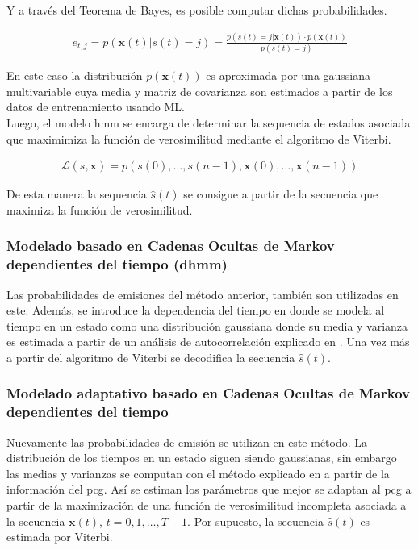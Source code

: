\indent Y a través del Teorema de Bayes, es posible computar dichas probabilidades.

\begin{align}
  e_{t,j} = p(\mathbf{x}(t)|s(t)=j) = \frac{p(s(t) = j|\mathbf{x}(t)) \cdot p(\mathbf{x}(t))}{p(s(t) = j)}
\end{align}

\indent En este caso la distribución $p(\mathbf{x}(t))$ es aproximada por una gaussiana multivariable cuya media y
matriz de covarianza son estimados a partir de los datos de entrenamiento usando ML. \\
\indent Luego, el modelo \acrshort{hmm} se encarga de determinar la sequencia de estados asociada que maximimiza la
función de verosimilitud mediante el algoritmo de Viterbi.

\begin{align}
  \mathcal{L}(s,\mathbf{x}) = p(s(0),\dots,s(n-1),\mathbf{x}(0),\dots,\mathbf{x}(n-1))
\end{align}

\indent De esta manera la sequencia $\hat{s}(t)$ se consigue a partir de la secuencia que maximiza la función de
verosimilitud.

\subsubsection*{Modelado basado en Cadenas Ocultas de Markov dependientes del tiempo (\acrshort{dhmm})}

\indent Las probabilidades de emisiones del método anterior, también son utilizadas en este. Además, se introduce la
dependencia del tiempo en donde se modela al tiempo en un estado como una distribución gaussiana donde su media y
varianza es estimada a partir de un análisis de autocorrelación explicado en \cite{pp:schmidt2010}. Una vez más a
partir del algoritmo de Viterbi se decodifica la secuencia $\hat{s}(t)$.

\subsubsection*{Modelado adaptativo basado en Cadenas Ocultas de Markov dependientes del tiempo}

\indent Nuevamente las probabilidades de emisión se utilizan en este método. La distribución de los tiempos en un
estado siguen siendo gaussianas, sin embargo las medias y varianzas se computan con el método explicado en
\cite{pp:oliveira-renna-coimbra} a partir de la información del \acrshort{pcg}. Así se estiman los parámetros que
mejor se adaptan al \acrshort{pcg} a partir de la maximización de una función de verosimilitud incompleta asociada a
la secuencia $\mathbf{x}(t)$, $t=0,1,\dots,T-1$. Por supuesto, la secuencia $\hat{s}(t)$ es estimada por Viterbi.

